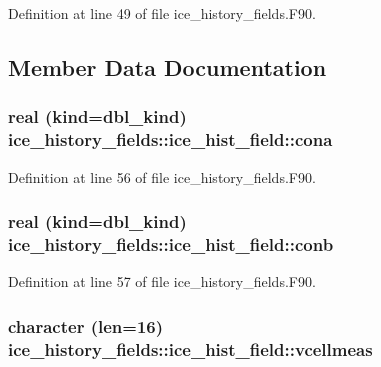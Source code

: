 Definition at line 49 of file ice\_\-history\_\-fields.F90.

\subsection{Member Data Documentation}
\hypertarget{typeice__history__fields_1_1ice__hist__field_ad87bd5af63226c5310b36674ea09b84a}{
\subsubsection[{cona}]{\setlength{\rightskip}{0pt plus 5cm}real (kind=dbl\_\-kind) {\bf ice\_\-history\_\-fields::ice\_\-hist\_\-field::cona}}}
\label{typeice__history__fields_1_1ice__hist__field_ad87bd5af63226c5310b36674ea09b84a}


Definition at line 56 of file ice\_\-history\_\-fields.F90.\hypertarget{typeice__history__fields_1_1ice__hist__field_acbb7efe62964caef752563e088014427}{
\subsubsection[{conb}]{\setlength{\rightskip}{0pt plus 5cm}real (kind=dbl\_\-kind) {\bf ice\_\-history\_\-fields::ice\_\-hist\_\-field::conb}}}
\label{typeice__history__fields_1_1ice__hist__field_acbb7efe62964caef752563e088014427}


Definition at line 57 of file ice\_\-history\_\-fields.F90.\hypertarget{typeice__history__fields_1_1ice__hist__field_a42bf1015001f3f3008bf6034839f7085}{
\subsubsection[{vcellmeas}]{\setlength{\rightskip}{0pt plus 5cm}character (len=16) {\bf ice\_\-history\_\-fields::ice\_\-hist\_\-field::vcellmeas}}}
\label{typeice__history__fields_1_1ice__hist__field_a42bf1015001f3f3008bf6034839f7085}


